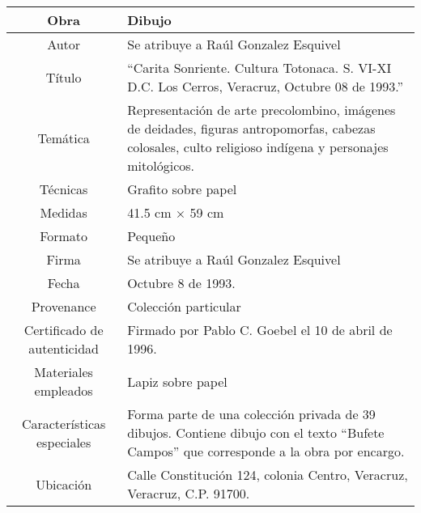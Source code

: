 \documentclass[10pt,letter]{report}
\begin{document}
\begin{table}[H]
\centering
\begin{tabular}{|c|m{}|}
\hline
Obra& Dibujo	\\
\hline
Autor & Se atribuye a Ra\'ul Gonzalez Esquivel\\
\hline
T\'itulo & ``Carita Sonriente. Cultura Totonaca. S. VI-XI D.C. Los Cerros, Veracruz, Octubre 08 de 1993.'' \\
\hline
Tem\'atica & Representaci\'on de arte precolombino, im\'agenes de deidades, figuras antropomorfas, cabezas colosales, culto religioso ind\'igena y personajes mitol\'ogicos.\\
\hline
T\'ecnicas &Grafito sobre papel \\
\hline
Medidas & 41.5 cm $\times$ 59 cm \\
\hline
 Formato & Peque\~no \\
 \hline
 Firma & Se atribuye a Ra\'ul Gonzalez Esquivel\\ 
 \hline
  Fecha & Octubre 8 de 1993.\\
 \hline
 Provenance & Colecci\'on particular\\
 \hline
 Certificado de autenticidad& Firmado por Pablo C. Goebel el 10 de abril de 1996.  \\
 \hline 
  Materiales empleados & Lapiz sobre papel\\
 \hline
 Caracter\'isticas especiales & Forma parte de una colecci\'on privada de 39 dibujos. 
Contiene dibujo con el texto ``Bufete Campos'' que corresponde a la obra por encargo. \\
\hline 
Ubicaci\'on & Calle Constituci\'on 124, colonia Centro, Veracruz, Veracruz, C.P. 91700.\\
\hline

\end{tabular}
\end{table}
\end{document}
